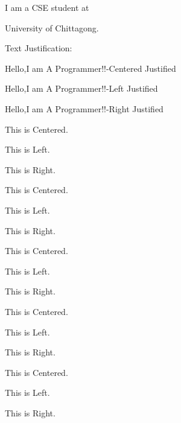 \documentclass[11pt]{article}
\begin{document}
I am a CSE student at \begin{tiny}University of Chittagong.\end{tiny}

\vspace{1cm}

Text Justification: 

\begin{center}Hello,I am A Programmer!!-Centered Justified\end{center}

\begin{flushleft}Hello,I am A Programmer!!-Left Justified\end{flushleft}

\begin{flushright}Hello,I am A Programmer!!-Right Justified\end{flushright}

\centering
This is Centered.

This is Left.

This is Right.

\vspace{1cm}

\Large
This is Centered.

This is Left.

This is Right.

\vspace{1cm}

\tiny
This is Centered.

This is Left.

This is Right.

\vspace{1cm}

\begin{Large}
    \begin{flushleft}
    This is Centered.

    This is Left.

    This is Right.
\end{flushleft}
\end{Large}

\vspace{1cm}

\begin{Huge}
    \begin{flushright}
    This is Centered.

    This is Left.

    This is Right.
\end{flushright}
\end{Huge}
\end{document}
